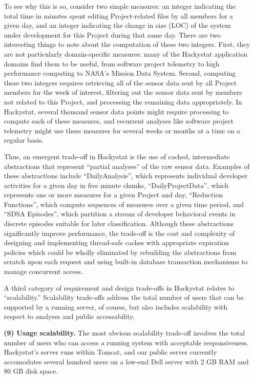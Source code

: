 \documentclass[10pt,twocolumn]{article}
\begin{document}
To see why this is so, consider two simple measures: an integer indicating
the total time in minutes spent editing Project-related files by all
members for a given day, and an integer indicating the change in size (LOC)
of the system under development for this Project during that same day.
There are two interesting things to note about the computation of these two
integers. First, they are not particularly domain-specific measures: many
of the Hackystat application domains find them to be useful, from software
project telemetry to high performance computing to NASA's Mission Data
System. Second, computing these two integers requires retrieving all of the
sensor data sent by all Project members for the week of interest, filtering
out the sensor data sent by members not related to this Project, and
processing the remaining data appropriately. In Hackystat, several thousand
sensor data points might require processing to compute each of these
measures, and recurrent analyses like software project telemetry might use
these measures for several weeks or months at a time on a regular basis.

Thus, an emergent trade-off in Hackystat is the use of cached, intermediate
abstractions that represent ``partial analyses'' of the raw sensor data.
Examples of these abstractions include ``DailyAnalysis'', which represents
individual developer activities for a given day in five minute chunks,
``DailyProjectData'', which represents one or more measures for a given
Project and day, ``Reduction Functions'', which compute sequences of
measures over a given time period, and ``SDSA Episodes'', which partition a
stream of developer behavioral events in discrete episodes suitable for
later classification.  Although these abstractions significantly improve
performance, the trade-off is the cost and complexity of designing and
implementing thread-safe caches with appropriate expiration policies which
could be wholly eliminated by rebuilding the abstractions from scratch upon
each request and using built-in database transaction mechanisms to manage
concurrent access.


A third category of requirement and design trade-offs in Hackystat relates
to ``scalability.''  Scalability trade-offs address the total number of
users that can be supported by a running server, of course, but also
includes scalability with respect to analyses and public accessability.

{\bf (9) Usage scalability.}  The most obvious scalability trade-off involves
the total number of users who can access a running system with acceptable
responsiveness.  Hackystat's server runs within Tomcat, and our public
server currently accomodates several hundred users on a low-end Dell server
with 2 GB RAM and 80 GB disk space. 
\end{document}

